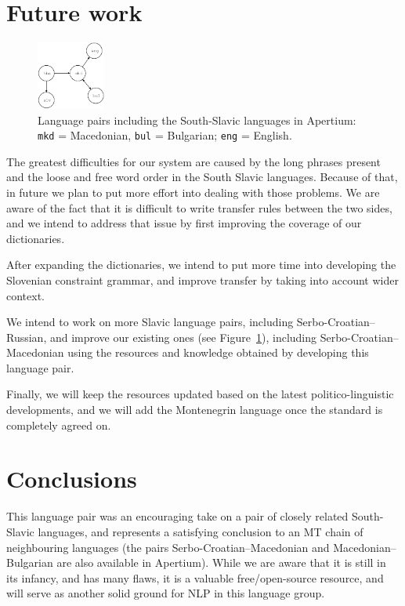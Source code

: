 \section{Future work}
\begin{figure}
\centering
\includegraphics[width=0.2\textwidth]{images/south-slavic-apertium}
\caption{Language pairs including the South-Slavic languages in Apertium: \texttt{mkd} = Macedonian,
\texttt{bul} = Bulgarian; \texttt{eng} = English.}
\label{fig:pairs}
\end{figure}

The greatest difficulties for our system are caused by the long phrases present 
and the loose and free word order in the South Slavic languages.
Because of that, in future we plan to put more effort into dealing with those problems.
We are aware of the fact that it is difficult to write transfer rules between the two sides,
and we intend to address that issue by first improving the coverage of our dictionaries.

After expanding the dictionaries, we intend to put more time into developing the Slovenian constraint grammar,
and improve transfer by taking into account wider context.

We intend to work on more Slavic language pairs, including Serbo-Croatian--Russian,
and improve our existing ones (see Figure~\ref{fig:pairs}), including Serbo-Croatian--Macedonian \cite{peradin12} using the 
resources and knowledge obtained by developing this language pair.

Finally, we will keep the resources updated based on the latest politico-linguistic developments,
and we will add the Montenegrin language once the standard is completely agreed on.


\section{Conclusions}

This language pair was an encouraging take on a pair of closely
related South-Slavic languages, and represents a satisfying conclusion
to an MT chain of neighbouring languages (the pairs Serbo-Croatian--Macedonian 
and Macedonian--Bulgarian are also available in Apertium). While we are aware that it
is still in its infancy, and has many flaws, it is a valuable
free/open-source resource, and will serve as another solid ground for NLP
in this language group.

